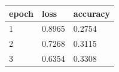 \begin{tabular}{lll}
\hline
epoch & loss & accuracy \\
\hline
1 & 0.8965 & 0.2754 \\
2 & 0.7268 & 0.3115 \\
3 & 0.6354 & 0.3308 \\
\hline
\end{tabular}
